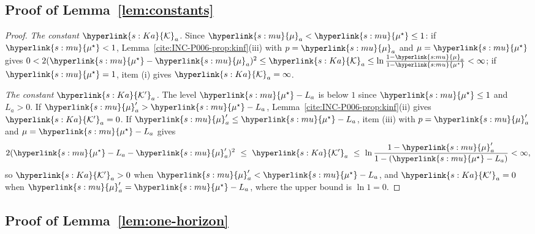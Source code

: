 \documentclass[11pt]{article}
\newcommand{\sy}[2]{\hyperlink{#1}{#2}}
\newcommand{\mean}{\sy{s:mu}{\mu}}
\newcommand{\ms}{\sy{s:mu}{\mu^{\star}}}
\newcommand{\Ka}{\sy{s:Ka}{\mathcal{K}}}
\newcommand{\Kp}{\sy{s:Ka}{\mathcal{K}'}}
\begin{document}
\subsection{Proof of Lemma~\ref{lem:constants}}\label{sec:proof-constants}

\begin{proof}
\emph{The constant $\Ka_a$.} Since $\mean_a<\ms\le1$: if $\ms<1$,
Lemma~\ref{cite:INC-P006-prop:kinf}(iii) with $p=\mean_a$ and $\mu=\ms$ gives
$0<2(\ms-\mean_a)^2\le\Ka_a\le\ln\frac{1-\mean_a}{1-\ms}<\infty$; if $\ms=1$, item (i) gives
$\Ka_a=\infty$.

\emph{The constant $\Kp_a$.} The level $\ms-L_a$ is below $1$ since $\ms\le1$ and $L_a>0$. If
$\mean'_a>\ms-L_a$, Lemma~\ref{cite:INC-P006-prop:kinf}(ii) gives $\Kp_a=0$. If
$\mean'_a\le\ms-L_a$, item (iii) with $p=\mean'_a$ and $\mu=\ms-L_a$ gives
\begin{equation*}
2(\ms-L_a-\mean'_a)^2\ \le\ \Kp_a\ \le\ \ln\frac{1-\mean'_a}{1-(\ms-L_a)}<\infty,
\end{equation*}
so $\Kp_a>0$ when $\mean'_a<\ms-L_a$, and $\Kp_a=0$ when $\mean'_a=\ms-L_a$, where the upper bound is
$\ln1=0$.
\end{proof}

\subsection{Proof of Lemma~\ref{lem:one-horizon}}\label{sec:proof-one-horizon}
\end{document}

